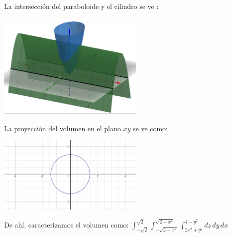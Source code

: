 \documentclass{article}
\begin{document}
\begin{enumerate}
{        La intersección del paraboloide y el cilindro se ve :
        \begin{center}
            \includegraphics[width=7cm]{img/ejercicio7.png}
        \end{center}
        La proyección del volumen en el plano $xy$ se ve como:
        \begin{center}
            \includegraphics[width=7cm]{img/ejercicio71.png}\\
        \end{center}
        De ahí, caracterizamos el volumen como: $\displaystyle\int_{-\sqrt{2}}^{\sqrt{2}}
        \int_{-\sqrt{2-x^2}}^{\sqrt{2-x^2}}\int_{2x^2+y^2}^{4-y^2}dz\,dy\,dx$

}
\end{enumerate}
\end{document}

